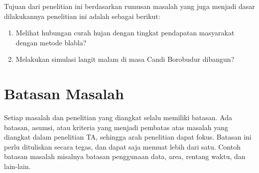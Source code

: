 Tujuan dari penelitian ini berdasarkan rumusan masalah yang juga menjadi dasar dilakukannya penelitian ini adalah sebagai berikut:
\begin{enumerate}
    \item Melihat hubungan curah hujan dengan tingkat pendapatan masyarakat dengan metode blabla?
    \item Melakukan simulasi langit malam di masa Candi Borobudur dibangun?
\end{enumerate}

\section{Batasan Masalah}
Setiap masalah dan penelitian yang diangkat selalu memiliki batasan. Ada batasan, asumsi, atau kriteria yang menjadi pembatas atas masalah yang diangkat dalam penelitian TA, sehingga arah penelitian dapat fokus. Batasan ini perlu dituliskan secara tegas, dan dapat saja memuat lebih dari satu. Contoh batasan masalah misalnya batasan penggunaan data, area, rentang waktu, dan lain-lain.


